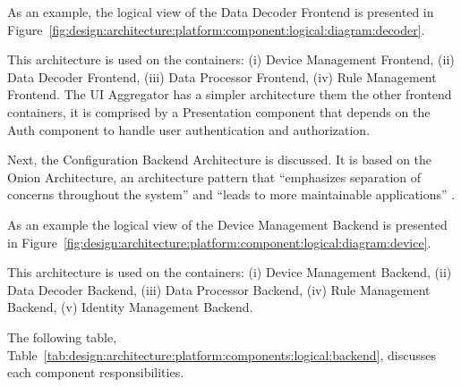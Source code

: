 As an example, the logical view of the Data Decoder Frontend is presented in Figure~\ref{fig:design:architecture:platform:component:logical:diagram:decoder}.

%       

This architecture is used on the containers: (i) Device Management Frontend, (ii) Data Decoder Frontend, (iii) Data Processor Frontend, (iv) Rule Management Frontend. The UI Aggregator has a simpler architecture them the other frontend containers, it is comprised by a Presentation component that depends on the Auth component to handle user authentication and authorization.

Next, the Configuration Backend Architecture is discussed. It is based on the Onion Architecture, an architecture pattern that ``emphasizes separation of concerns throughout the system'' and ``leads to more maintainable applications'' \parencite{onion}.

As an example the logical view of the Device Management Backend is presented in Figure~\ref{fig:design:architecture:platform:component:logical:diagram:device}.

%       

This architecture is used on the containers: (i) Device Management Backend, (ii) Data Decoder Backend, (iii) Data Processor Backend, (iv) Rule Management Backend, (v) Identity Management Backend.

The following table, Table~\ref{tab:design:architecture:platform:components:logical:backend}, discusses each component responsibilities.

